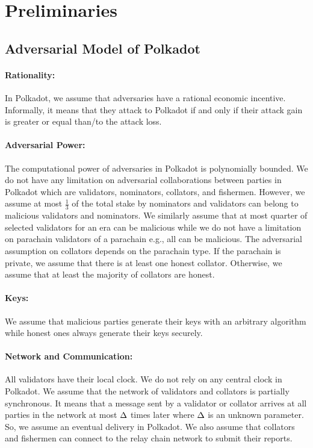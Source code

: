 \section{Preliminaries}

\subsection{Adversarial Model of Polkadot}

\paragraph{Rationality:} In Polkadot, we assume that adversaries have a rational economic incentive. Informally, it means that they attack to Polkadot if and only if their attack gain is greater or equal than/to the attack loss.

\paragraph{Adversarial Power:} The computational power of adversaries in Polkadot is polynomially bounded.  We do not have any limitation on adversarial collaborations between parties in Polkadot which are validators, nominators, collators, and fishermen. However, we assume at most $\frac{1}{3}$ of the total stake by nominators and validators can belong to malicious validators and nominators.
We similarly assume that at most quarter of selected validators for an era can be malicious while we do not have a limitation on parachain validators of a parachain e.g., all can be malicious.
The adversarial assumption on collators depends on the parachain type. If the parachain is private, we assume that there is at least one honest collator. Otherwise, we assume that at least the majority of collators are honest.

\paragraph{Keys:} We assume that malicious parties generate their keys with an arbitrary algorithm while honest ones always generate their keys securely.

\paragraph{Network and Communication:} All validators have their local clock. We do not rely on any central clock in Polkadot. We assume that the network of validators and collators is partially synchronous. It means that a message sent by a validator or collator arrives at all parties in the network at most $\Delta$ times later where $\Delta$ is an unknown parameter. So, we assume an eventual delivery in Polkadot.
We also assume that collators and fishermen can connect to the relay chain network to submit their reports.

